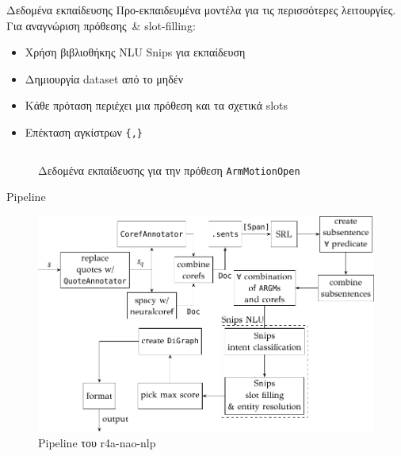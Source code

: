 \documentclass{beamer}
\def\textenglish{}
\newcommand{\en}[1]{\textenglish{#1}}
\newcommand{\projectname}{\en{r4a-nao-nlp}}
\begin{document}
\begin{frame}[fragile]{Δεδομένα εκπαίδευσης}
    Προ-εκπαιδευμένα μοντέλα για τις περισσότερες λειτουργίες.
    Για αναγνώριση πρόθεσης~\& slot-filling:
    \begin{itemize}
        \item Χρήση βιβλιοθήκης NLU Snips για εκπαίδευση
        \item Δημιουργία dataset από το μηδέν
        \item Κάθε πρόταση περιέχει μια πρόθεση και τα σχετικά slots
        \item Επέκταση αγκίστρων \texttt{\{,\}}
    \end{itemize}
    \begin{figure}
        \inputminted[fontsize=\tiny]{text}{../data/utterances_ArmMotionOpen}
        \caption{Δεδομένα εκπαίδευσης για την πρόθεση \texttt{ArmMotionOpen}}
    \end{figure}
\end{frame}

\begin{frame}{\en{Pipeline}}
    \begin{figure}
        \includegraphics[width=\textwidth]{pipeline.pdf}
        \caption{Pipeline του \projectname{}}
    \end{figure}
\end{frame}
\end{document}
